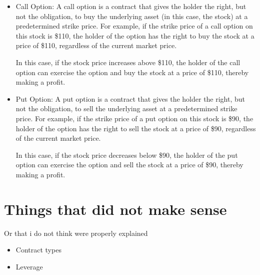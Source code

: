 \documentclass{article}
\theoremstyle{mytheoremstyle}
\theoremstyle{mytheoremstyle}
\theoremstyle{myproblemstyle}
\begin{document}
\begin{itemize}
	\item Call Option:
	      A call option is a contract that gives the holder the right, but not the obligation, to buy the underlying asset (in this case, the stock) at a predetermined strike price. For example, if the strike price of a call option on this stock is \$110, the holder of the option has the right to buy the stock at a price of \$110, regardless of the current market price.

	      In this case, if the stock price increases above \$110, the holder of the call option can exercise the option and buy the stock at a price of \$110, thereby making a profit.

	\item Put Option:
	      A put option is a contract that gives the holder the right, but not the obligation, to sell the underlying asset at a predetermined strike price. For example, if the strike price of a put option on this stock is \$90, the holder of the option has the right to sell the stock at a price of \$90, regardless of the current market price.

	      In this case, if the stock price decreases below \$90, the holder of the put option can exercise the option and sell the stock at a price of \$90, thereby making a profit.
\end{itemize}


\section{Things that did not make sense}
Or that i do not think were properly explained
\begin{itemize}
	\item Contract types
	\item Leverage
\end{itemize}
\end{document}
